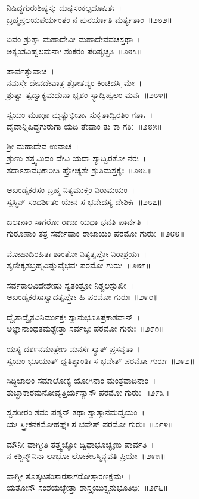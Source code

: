 ನಿಷಿದ್ಧಗುರುಶಿಷ್ಯಸ್ತು ದುಷ್ಟಸಂಕಲ್ಪದೂಷಿತಃ~।\\
ಬ್ರಹ್ಮಪ್ರಲಯಪರ್ಯಂತಂ ನ ಪುನರ್ಯಾತಿ ಮರ್ತ್ಯತಾಂ~॥೨೮೨॥

ಏವಂ ಶ್ರುತ್ವಾ ಮಹಾದೇವೀ ಮಹಾದೇವವಚಸ್ತಥಾ~।\\
ಅತ್ಯಂತವಿಹ್ವಲಮನಾಃ ಶಂಕರಂ ಪರಿಪೃಚ್ಛತಿ~॥೨೮೩॥

ಪಾರ್ವತ್ಯುವಾಚ~।\\
ನಮಸ್ತೇ ದೇವದೇವಾತ್ರ ಶ್ರೋತವ್ಯಂ ಕಿಂಚಿದಸ್ತಿ ಮೇ~।\\
ಶ್ರುತ್ವಾ ತ್ವದ್ವಾಕ್ಯಮಧುನಾ ಭೃಶಂ ಸ್ಯಾದ್ವಿಹ್ವಲಂ ಮನಃ~॥೨೮೪॥

ಸ್ವಯಂ ಮೂಢಾ ಮೃತ್ಯುಭೀತಾಃ ಸುಕೃತಾದ್ವಿರತಿಂ ಗತಾಃ~।\\
ದೈವಾನ್ನಿಷಿದ್ಧಗುರುಗಾ ಯದಿ ತೇಷಾಂ ತು ಕಾ ಗತಿಃ~॥೨೮೫॥

ಶ್ರೀ ಮಹಾದೇವ ಉವಾಚ~।\\
ಶ್ರುಣು ತತ್ತ್ವಮಿದಂ ದೇವಿ ಯದಾ ಸ್ಯಾದ್ವಿರತೋ ನರಃ~।\\
ತದಾಽಸಾವಧಿಕಾರೀತಿ ಪ್ರೋಚ್ಯತೇ ಶ್ರುತಿಮಸ್ತಕೈಃ~॥೨೮೬॥

ಅಖಂಡೈಕರಸಂ ಬ್ರಹ್ಮ ನಿತ್ಯಮುಕ್ತಂ ನಿರಾಮಯಂ~।\\
ಸ್ವಸ್ಮಿನ್ ಸಂದರ್ಶಿತಂ ಯೇನ ಸ ಭವೇದಸ್ಯ ದೇಶಿಕಃ~॥೨೮೭॥

ಜಲಾನಾಂ ಸಾಗರೋ ರಾಜಾ ಯಥಾ ಭವತಿ ಪಾರ್ವತಿ~।\\
ಗುರೂಣಾಂ ತತ್ರ ಸರ್ವೇಷಾಂ ರಾಜಾಯಂ ಪರಮೋ ಗುರುಃ~॥೨೮೮॥

ಮೋಹಾದಿರಹಿತಃ ಶಾಂತೋ ನಿತ್ಯತೃಪ್ತೋ ನಿರಾಶ್ರಯಃ~।\\
ತೃಣೀಕೃತಬ್ರಹ್ಮವಿಷ್ಣುವೈಭವಃ ಪರಮೋ ಗುರುಃ~॥೨೮೯॥

ಸರ್ವಕಾಲವಿದೇಶೇಷು ಸ್ವತಂತ್ರೋ ನಿಶ್ಚಲಸ್ಸುಖೀ~।\\
ಅಖಂಡೈಕರಸಾಸ್ವಾದತೃಪ್ತೋ ಹಿ ಪರಮೋ ಗುರುಃ~॥೨೯೦॥

ದ್ವೈತಾದ್ವೈತವಿನಿರ್ಮುಕ್ತಃ ಸ್ವಾನುಭೂತಿಪ್ರಕಾಶವಾನ್~।\\
ಅಜ್ಞಾನಾಂಧತಮಶ್ಛೇತ್ತಾ ಸರ್ವಜ್ಞಃ ಪರಮೋ ಗುರುಃ~॥೨೯೧॥

ಯಸ್ಯ ದರ್ಶನಮಾತ್ರೇಣ ಮನಸಃ ಸ್ಯಾತ್ ಪ್ರಸನ್ನತಾ~।\\
ಸ್ವಯಂ ಭೂಯಾತ್ ಧೃತಿಶ್ಶಾಂತಿಃ ಸ ಭವೇತ್ ಪರಮೋ ಗುರುಃ~॥೨೯೨॥

ಸಿದ್ಧಿಜಾಲಂ ಸಮಾಲೋಕ್ಯ ಯೋಗಿನಾಂ ಮಂತ್ರವಾದಿನಾಂ~।\\
ತುಚ್ಛಾಕಾರಮನೋವೃತ್ತಿರ್ಯಸ್ಯಾಸೌ ಪರಮೋ ಗುರುಃ~॥೨೯೩॥

ಸ್ವಶರೀರಂ ಶವಂ ಪಶ್ಯನ್ ತಥಾ ಸ್ವಾತ್ಮಾನಮದ್ವಯಂ~।\\
ಯಃ ಸ್ತ್ರೀಕನಕಮೋಹಘ್ನಃ ಸ ಭವೇತ್ ಪರಮೋ ಗುರುಃ~॥೨೯೪॥

ಮೌನೀ ವಾಗ್ಮೀತಿ ತತ್ತ್ವಜ್ಞೋ ದ್ವಿಧಾಭೂಚ್ಛೃಣು ಪಾರ್ವತಿ~।\\
ನ ಕಶ್ಚಿನ್ಮೌನಿನಾ ಲಾಭೋ ಲೋಕೇಽಸ್ಮಿನ್ಭವತಿ ಪ್ರಿಯೇ~॥೨೯೫॥

ವಾಗ್ಮೀ ತೂತ್ಕಟಸಂಸಾರಸಾಗರೋತ್ತಾರಣಕ್ಷಮಃ~।\\
ಯತೋಸೌ ಸಂಶಯಚ್ಛೇತ್ತಾ ಶಾಸ್ತ್ರಯುಕ್ತ್ಯನುಭೂತಿಭಿಃ~॥೨೯೬॥

